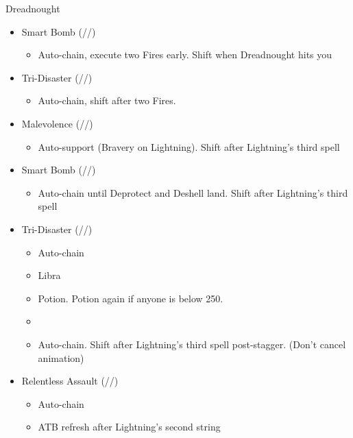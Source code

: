 \renewcommand{\first}{[1] Relentless Assault (\rav/\com/\rav)}
\renewcommand{\second}{[2] Bully (\syn/\com/\sab)}
\renewcommand{\third}{[3] Relentless Assault (\rav/\com/\rav)}
\renewcommand{\fourth}{[4] Smart Bomb (\rav/\rav/\sab)}
\renewcommand{\fifth}{[5] Tri-Disaster (\rav/\rav/\rav)}
\renewcommand{\sixth}{[6] Malevolence (\syn/\rav/\rav)}

\begin{battle}{Dreadnought}
\begin{multicols}{2}
\begin{itemize}
    \item \fourth
    \begin{itemize}
        \item Auto-chain, execute two Fires early. Shift when Dreadnought hits you
    \end{itemize}
    \item \fifth
    \begin{itemize}
        \item Auto-chain, shift after two Fires.
    \end{itemize}
    \item \sixth
    \begin{itemize}
        \item Auto-support (Bravery on Lightning). Shift after Lightning’s third spell
    \end{itemize}
    \item \fourth 
    \begin{itemize}
        \item Auto-chain until Deprotect and Deshell land. Shift after Lightning’s third spell
    \end{itemize}
    \item \fifth
    \begin{itemize}
        \item Auto-chain
        \item Libra
        \item Potion. Potion again if anyone is below 250.
        \item \stagger
        \item Auto-chain. Shift after Lightning’s third spell post-stagger. (Don't cancel animation)
    \end{itemize}
    \item \first
    \begin{itemize}
        \item Auto-chain
        \item ATB refresh after Lightning's second string

\end{itemize}
\end{itemize}
\end{multicols}
\end{battle}
